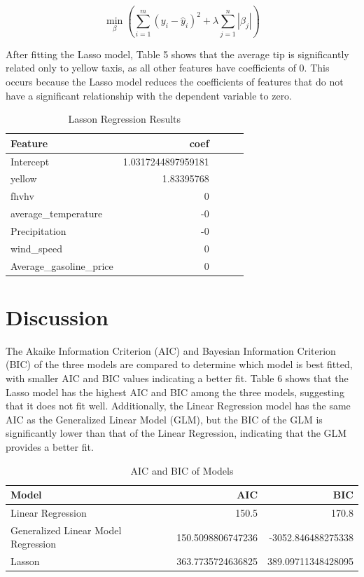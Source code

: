 \documentclass[11pt]{article}
\begin{document}
\begin{equation}
    \min_{\beta} \left( \sum_{i=1}^{m} \left( y_i - \hat{y}_i \right)^2 + \lambda \sum_{j=1}^{n} |\beta_j| \right)
\end{equation}

After fitting the Lasso model, Table 5 shows that the average tip is significantly related only to yellow taxis, as all other features have coefficients of 0. This occurs because 
the Lasso model reduces the coefficients of features that do not have a significant relationship with the dependent variable to zero.

\begin{table}[ht]
    \centering
    \begin{tabular}{l r r r r }
    \hline
    \textbf{Feature} & \textbf{coef} \\
    \hline
    Intercept             & 1.0317244897959181   \\
    yellow                & 1.83395768  \\
    fhvhv                 & 0   \\
    average\_temperature  & -0 \\
    Precipitation         & -0 \\
    wind\_speed           & 0 \\
    Average\_gasoline\_price & 0   \\
    \hline
    \end{tabular}
    \caption{Lasson Regression Results}
    \label{tab:Lasson Regression Results}
\end{table}

\section{Discussion}
The Akaike Information Criterion (AIC) and Bayesian Information Criterion (BIC) of the three models are compared to determine which model is best fitted, with smaller AIC and BIC values 
indicating a better fit. Table 6 shows that the Lasso model has the highest AIC and BIC among the three models, suggesting that it does not fit well. Additionally, the Linear Regression 
model has the same AIC as the Generalized Linear Model (GLM), but the BIC of the GLM is significantly lower than that of the Linear Regression, indicating that the GLM provides a better 
fit.
\begin{table}[ht]
    \centering
    \begin{tabular}{l r r  }
    \hline
    \textbf{Model} & \textbf{AIC} & \textbf{BIC} \\
    \hline
    Linear Regression   & 150.5         & 170.8  \\
    Generalized Linear Model Regression &    150.5098806747236       & -3052.846488275338  \\
    Lasson         &   363.7735724636825    &  389.09711348428095   \\
    \hline
    \end{tabular}
    \caption{AIC and BIC of Models}
    \label{tab:AIC and BIC of Models}
\end{table}
\end{document}
